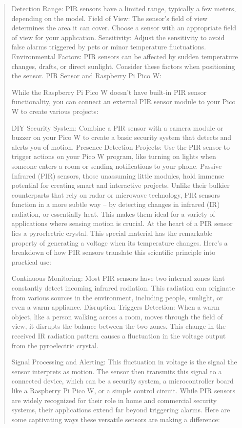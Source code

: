 \documentclass[12pt]{report}
\begin{document}
\begin{quote}
				Detection Range: PIR sensors have a limited range, typically a few meters, depending on the model.
				Field of View: The sensor's field of view determines the area it can cover. Choose a sensor with an appropriate field of view for your application.
				Sensitivity: Adjust the sensitivity to avoid false alarms triggered by pets or minor temperature fluctuations.
				Environmental Factors: PIR sensors can be affected by sudden temperature changes, drafts, or direct sunlight. Consider these factors when positioning the sensor.
				PIR Sensor and Raspberry Pi Pico W:
				
				While the Raspberry Pi Pico W doesn't have built-in PIR sensor functionality, you can connect an external PIR sensor module to your Pico W to create various projects:
				
				DIY Security System: Combine a PIR sensor with a camera module or buzzer on your Pico W to create a basic security system that detects and alerts you of motion.
				Presence Detection Projects: Use the PIR sensor to trigger actions on your Pico W program, like turning on lights when someone enters a room or sending notifications to your phone. Passive Infrared (PIR) sensors, those unassuming little modules, hold immense potential for creating smart and interactive projects. Unlike their bulkier counterparts that rely on radar or microwave technology, PIR sensors function in a more subtle way – by detecting changes in infrared (IR) radiation, or essentially heat. This makes them ideal for a variety of applications where sensing motion is crucial. At the heart of a PIR sensor lies a pyroelectric crystal. This special material has the remarkable property of generating a voltage when its temperature changes. Here's a breakdown of how PIR sensors translate this scientific principle into practical use:
				
				Continuous Monitoring: Most PIR sensors have two internal zones that constantly detect incoming infrared radiation. This radiation can originate from various sources in the environment, including people, sunlight, or even a warm appliance. Disruption Triggers Detection: When a warm object, like a person walking across a room, moves through the field of view, it disrupts the balance between the two zones. This change in the received IR radiation pattern causes a fluctuation in the voltage output from the pyroelectric crystal.
				
				Signal Processing and Alerting: This fluctuation in voltage is the signal the sensor interprets as motion. The sensor then transmits this signal to a connected device, which can be a security system, a microcontroller board like a Raspberry Pi Pico W, or a simple control circuit. While PIR sensors are widely recognized for their role in home and commercial security systems, their applications extend far beyond triggering alarms. Here are some captivating ways these versatile sensors are making a difference:
				

\end{quote}
\end{document}
